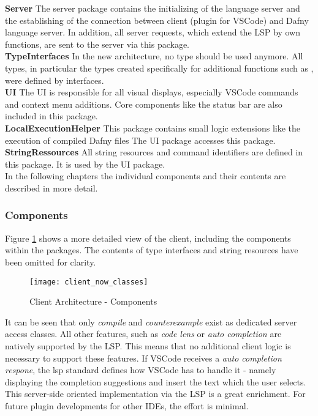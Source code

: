 {\bf Server} \textendash{}
The server package contains the initializing of the language server and the establishing of the connection between client (plugin for VSCode) and Dafny language server. In addition, all server requests, which extend the LSP by own functions, are sent to the server via this package. \\

{\bf TypeInterfaces} \textendash{}
In the new architecture, no  type should be used anymore.
All types, in particular the types created specifically for additional functions such as , were defined by interfaces. \\

{\bf UI} \textendash{}
The UI is responsible for all visual displays, especially VSCode commands and context menu additions.
 Core components like the status bar are also included in this package. \\

{\bf LocalExecutionHelper} \textendash{}
This package contains small logic extensions like the execution of compiled Dafny files
 The UI package accesses this package. \\

{\bf StringRessources} \textendash{}
All string resources and command identifiers are defined in this package.
It is used by the UI package. \\

In the following chapters the individual components and their contents are described in more detail.

\subsubsection{Components}
Figure \ref{fig:client_now_classes} shows a more detailed view of the client, including the components within the packages.
The contents of type interfaces and string resources have been omitted for clarity. \\

\begin{figure}[H]
    \centering
    \texttt{[image: client\_now\_classes]}
    \caption{Client Architecture - Components}
    \label{fig:client_now_classes}
\end{figure}

It can be seen that only \textit{compile} and \textit{counterexample} exist as dedicated server access classes.
All other features, such as \textit{code lens} or \textit{auto completion} are natively supported by the LSP.
This means that no additional client logic is necessary to support these features.
If VSCode receives a \textit{auto completion respone}, the lsp standard defines how VSCode has to handle it - namely displaying the completion suggestions and insert the text which the user selects.
This server-side oriented implementation via the LSP is a great enrichment.
For future plugin developments for other IDEs, the effort is minimal.

